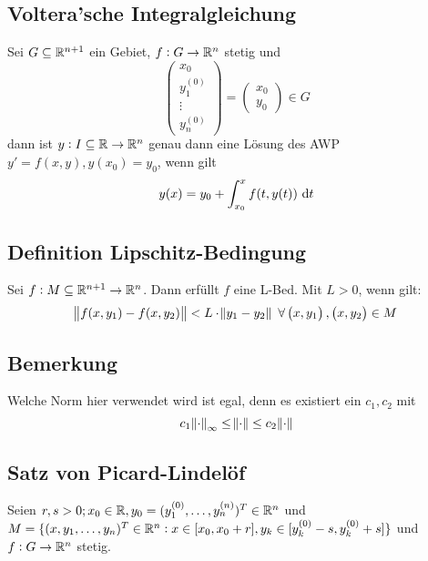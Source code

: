 \subsection{Voltera'sche Integralgleichung}
Sei $G \subseteq \mathbb{R}^{n+1}$ ein Gebiet, $f: G \to \mathbb{R}^n$ stetig und
\begin{equation*}
	\begin{pmatrix}
		x_0 \\ y_1^{(0)} \\ \vdots \\ y_n^{(0)}
	\end{pmatrix} = 
	\begin{pmatrix}
		x_0 \\ y_0
	\end{pmatrix}
	\in G
\end{equation*} 
dann ist $y: I \subseteq \mathbb{R} \to \mathbb{R}^n$ genau dann eine Lösung des AWP $y'=f(x,y), y(x_0)=y_0$, wenn gilt
\begin{equation*}
	y(x) = y_0 + \int_{x_0}^x f(t, y(t)) \text{ d}t
\end{equation*}

\subsection{Definition Lipschitz-Bedingung}
Sei $f: M \subseteq \mathbb{R}^{n+1} \to \mathbb{R}^n$. Dann erfüllt $f$ eine L-Bed. Mit $L>0$, wenn gilt:
\begin{equation*}
	\norm{f(x,y_1) - f(x, y_2)} < L \cdot \norm{y_1-y_2}\ \forall 
	\begin{pmatrix}
		x, y_1
	\end{pmatrix},
	\begin{pmatrix}
		x, y_2
	\end{pmatrix} \in M
\end{equation*}

\subsection{Bemerkung}
Welche Norm hier verwendet wird ist egal, denn es existiert ein $c_1, c_2$ mit
\begin{equation*}
	c_1 \norm{\cdot}_\infty \leq \norm{\cdot} \leq c_2 \norm{\cdot}
\end{equation*}

\subsection{Satz von Picard-Lindelöf}
Seien $r,s > 0; x_0 \in \mathbb{R}, y_0 = (y_1^{(0)}, \ldots, y_n^{(n)})^T \in \mathbb{R}^n$ und $M = \{
(x, y_1, \ldots, y_n)^T\in \mathbb{R}^n: x \in [x_0, x_0 + r], y_k \in [y_k^{(0)}-s, y_k^{(0)}+s]\}$
und $f: G \to \mathbb{R}^n$ stetig.

